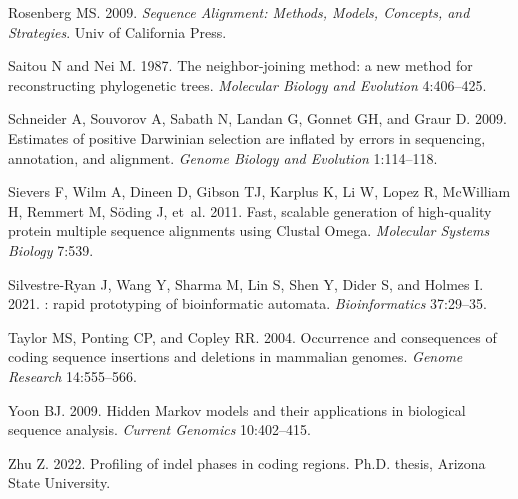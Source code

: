 \documentclass[12pt,letterpaper]{article}
\begin{document}
\begin{thebibliography}{43}
Rosenberg MS. 2009.
\newblock \emph{Sequence Alignment: Methods, Models, Concepts, and Strategies}.
\newblock Univ of California Press.

Saitou N and Nei M. 1987.
\newblock The neighbor-joining method: a new method for reconstructing
  phylogenetic trees.
\newblock \emph{Molecular Biology and Evolution} 4:406--425.

Schneider A, Souvorov A, Sabath N, Landan G, Gonnet GH, and Graur D. 2009.
\newblock Estimates of positive {Darwinian} selection are inflated by errors in
  sequencing, annotation, and alignment.
\newblock \emph{Genome Biology and Evolution} 1:114--118.

Sievers F, Wilm A, Dineen D, Gibson TJ, Karplus K, Li W, Lopez R, McWilliam H,
  Remmert M, S{\"o}ding J, et~al. 2011.
\newblock Fast, scalable generation of high-quality protein multiple sequence
  alignments using {Clustal Omega}.
\newblock \emph{Molecular Systems Biology} 7:539.

Silvestre-Ryan J, Wang Y, Sharma M, Lin S, Shen Y, Dider S, and Holmes I. 2021.
: rapid prototyping of bioinformatic automata.
\newblock \emph{Bioinformatics} 37:29--35.

Taylor MS, Ponting CP, and Copley RR. 2004.
\newblock Occurrence and consequences of coding sequence insertions and
  deletions in mammalian genomes.
\newblock \emph{Genome Research} 14:555--566.

Yoon BJ. 2009.
\newblock Hidden {Markov} models and their applications in biological sequence
  analysis.
\newblock \emph{Current Genomics} 10:402--415.

Zhu Z. 2022.
\newblock Profiling of indel phases in coding regions.
\newblock Ph.D. thesis, Arizona State University.

\end{thebibliography}


\nolinenumbers
\end{document}
